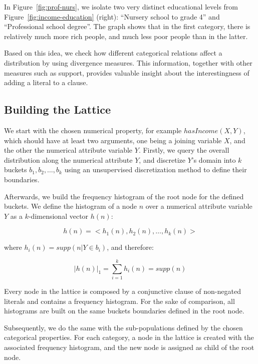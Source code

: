 In Figure~\ref{fig:prof-nurs}, we isolate two very distinct educational levels from Figure~\ref{fig:income-education}
(right): ``Nursery school to grade 4'' and ``Professional school degree''. The graph shows that in the first category,
there is relatively much more rich people, and much less poor people than in the latter.

Based on this idea, we check how different categorical relations affect a distribution by using divergence measures.
This information, together with other measures such as support, provides valuable insight about the interestingness of
adding a literal to a clause.


\subsection{Building the Lattice}

We start with the chosen numerical property, for example $hasIncome(X,Y)$, which should have at least two
arguments, one being a joining variable $X$, and the other the numerical attribute variable $Y$. Firstly, we query the
overall distribution along the numerical attribute $Y$, and discretize $Y$'s domain into $k$ buckets $b_1, b_2,
\dots, b_k$ using an unsupervised discretization method to define their boundaries. 

Afterwards, we build the frequency histogram of the root node for the defined buckets. We define the histogram of a
node $n$ over a numerical attribute variable $Y$ as a $k$-dimensional vector $h(n)$:

\begin{equation}
 h(n)=<h_1(n),h_2(n),\ldots,h_k(n)>
\end{equation}

where $h_i(n)=supp(n|Y \in b_i)$, and therefore:

\begin{equation}
  |h(n)|_1=\sum_{i=1}^{k}h_i(n)=supp(n)
\end{equation}

Every node in the lattice is composed by a conjunctive clause of non-negated literals and contains a frequency
histogram. For the sake of comparison, all histograms are built on the same buckets boundaries defined in the
root node. 

Subsequently, we do the same with the sub-populations defined by the chosen categorical properties. For each category, a
node in the lattice is created with the associated frequency histogram, and the new node is assigned as child of the
root node.

